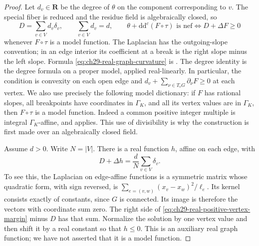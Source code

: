 \begin{proof}
Let $d_v\in\mathbf R$ be the degree of $\theta$ on the component
corresponding to $v$.  The special fiber is reduced and the residue field
is algebraically closed, so
\begin{equation}
\label{eq:ch29-real-graph-curvature}
 D=\sum_{v\in V}d_v\delta_v,
 \qquad \sum_{v\in V}d_v=d,
 \qquad
 \theta+\mathrm d\mathrm d^c(F\circ\tau)\text{ is nef}
       \Longleftrightarrow D+\Delta F\geq0
\end{equation}
whenever $F\circ\tau$ is a model function.  The Laplacian has the
outgoing-slope convention; in an edge interior its coefficient at a break
is the right slope minus the left slope.  Formula
\eqref{eq:ch29-real-graph-curvature} is
\cite[Proposition~3.7]{GJKM19}.  The degree identity is the degree
formula on a proper model, applied real-linearly.  In particular, the
condition is convexity on each open edge and
$d_v+\sum_{\nu\in T_vG}\partial_\nu F\geq0$ at each vertex.
We also use precisely the following model dictionary:
if $F$ has rational slopes, all breakpoints have coordinates in
$\Gamma_K$, and all its vertex values are in $\Gamma_K$, then
$F\circ\tau$ is a model function.  Indeed a common positive integer
multiple is integral $\Gamma_K$-affine, and
\cite[Proposition~3.5(3)]{GJKM19} applies.  This use of divisibility is
why the construction is first made over an algebraically closed field.

Assume $d>0$.  Write $N=|V|$.  There is a real function $h$, affine on
each edge, with
\begin{equation}
\label{eq:ch29-real-positive-vertex-margin}
 D+\Delta h=\frac dN\sum_{v\in V}\delta_v.
\end{equation}
To see this, the Laplacian on edge-affine functions is a symmetric
matrix whose quadratic form, with sign reversed, is
$\sum_{e=(v,w)}(x_v-x_w)^2/\ell_e$.  Its kernel consists exactly of
constants, since $G$ is connected.  Its image is therefore the vectors
with coordinate sum zero.  The right side of
\eqref{eq:ch29-real-positive-vertex-margin} minus $D$ has that sum.
Normalize the solution by one vertex value and then shift it by a real
constant so that $h\leq0$.  This is an auxiliary real graph function;
we have not asserted that it is a model function.


\end{proof}
